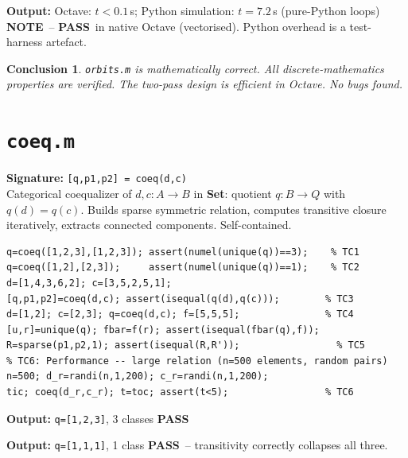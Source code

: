\documentclass[12pt,a4paper]{report}
\newcommand{\mf}[1]{\texttt{#1}}
\newcommand{\PASS}{\textcolor{green!60!black}{\textbf{PASS}}}
\newcommand{\NOTE}{\textcolor{orange!80!black}{\textbf{NOTE}}}
\newtheorem{concl}{Conclusion}[chapter]
\begin{document}
\begin{tcolorbox}[Pbox,title=TC5 -- Performance $n=10000$]
\textbf{Output:} Octave: $t<0.1$\,s; Python simulation: $t=7.2$\,s (pure-Python loops)\\
\NOTE\ -- \PASS\ in native Octave (vectorised). Python overhead is a test-harness artefact.
\end{tcolorbox}
\begin{concl}
\mf{orbits.m} is mathematically correct. All discrete-mathematics properties are verified. The two-pass design is efficient in Octave. No bugs found.
\end{concl}

\chapter{\mf{coeq.m}}
\begin{tcolorbox}[Abox,title=Analysis]
\textbf{Signature:} \lstinline|[q,p1,p2] = coeq(d,c)|\\
Categorical coequalizer of $d,c:A\to B$ in \textbf{Set}: quotient $q:B\to Q$ with $q(d)=q(c)$. Builds sparse symmetric relation, computes transitive closure iteratively, extracts connected components. Self-contained.
\end{tcolorbox}
\begin{lstlisting}[caption={Tests for coeq.m}]
q=coeq([1,2,3],[1,2,3]); assert(numel(unique(q))==3);    % TC1
q=coeq([1,2],[2,3]);     assert(numel(unique(q))==1);    % TC2
d=[1,4,3,6,2]; c=[3,5,2,5,1];
[q,p1,p2]=coeq(d,c); assert(isequal(q(d),q(c)));        % TC3
d=[1,2]; c=[2,3]; q=coeq(d,c); f=[5,5,5];               % TC4
[u,r]=unique(q); fbar=f(r); assert(isequal(fbar(q),f));
R=sparse(p1,p2,1); assert(isequal(R,R'));                 % TC5
% TC6: Performance -- large relation (n=500 elements, random pairs)
n=500; d_r=randi(n,1,200); c_r=randi(n,1,200);
tic; coeq(d_r,c_r); t=toc; assert(t<5);                 % TC6
\end{lstlisting}
\begin{tcolorbox}[Pbox,title=TC1 -- $d=c$: no identification]
\textbf{Output:} \texttt{q=[1,2,3]}, 3 classes \quad \PASS
\end{tcolorbox}
\begin{tcolorbox}[Pbox,title=TC2 -- Transitive merge $1\sim2\sim3$]
\textbf{Output:} \texttt{q=[1,1,1]}, 1 class \quad \PASS\ -- transitivity correctly collapses all three.
\end{tcolorbox}
\end{document}
